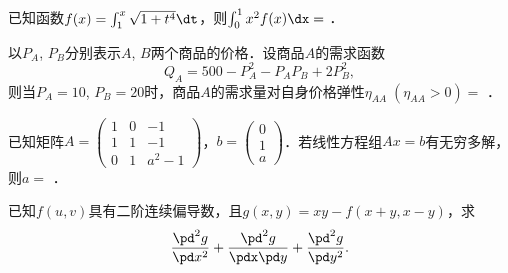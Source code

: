 \documentclass[plain,noanswer,medmath]{../../template/jnuexam}
\begin{document}
\begin{problem}
已知函数$f(x) = \int_1^x \sqrt{1 + t^4} \dt$，则$\int_0^1 x^2 f(x)\dx =$ \fillin{}．
\end{problem}


\begin{problem}
以$P_A$, $P_B$分别表示$A$, $B$两个商品的价格．设商品$A$的需求函数
$$Q_A = 500 - P_A^2 - P_A P_B + 2P_B^2,$$
则当$P_A=10$, $P_B=20$时，商品$A$的需求量对自身价格弹性$\eta_{AA}\;(\eta_{AA} > 0)=$ \fillin{}．
\end{problem}


\begin{problem}
已知矩阵$A = \begin{pmatrix}
  1 & 0 & -1 \\
  1 & 1 & -1 \\
  0 & 1 & a^2 - 1
\end{pmatrix}$，$b = \begin{pmatrix}
  0 \\
  1 \\
  a
\end{pmatrix}$．若线性方程组$Ax = b$有无穷多解，则$a =$ \fillin{}．
\end{problem}








\begin{problem}[points=10]
已知$f(u,v)$具有二阶连续偏导数，且$g(x,y) = xy - f(x + y,x - y)$，求
$$\frac{\pd^2 g}{\pd x^2} + \frac{\pd^2 g}{\pdx\pd y} + \frac{\pd^2 g}{\pd y^2}.$$
\end{problem}














\end{document}
